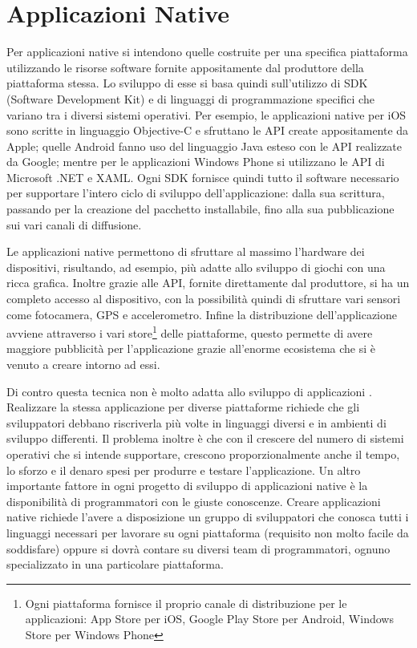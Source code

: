     \section{Applicazioni Native}
    \label{sec:nativapp}
        Per applicazioni native si intendono quelle costruite per una specifica
        piattaforma utilizzando le risorse software fornite appositamente dal
        produttore della piattaforma stessa.
        Lo sviluppo di esse si basa quindi sull'utilizzo di SDK
        (Soft\-ware De\-vel\-op\-ment Kit) e di
        linguaggi di programmazione specifici che variano tra i diversi
        sistemi operativi. Per esempio,
        le applicazioni native per iOS sono scritte in linguaggio Objective-C
        e sfruttano le API create appositamente da Apple; quelle Android fanno
        uso del linguaggio Java esteso con le API realizzate da Google; mentre
        per le applicazioni Windows Phone si utilizzano le API di
        Microsoft .NET e XAML. Ogni SDK fornisce quindi tutto il soft\-ware necessario
        per supportare l'intero ciclo di sviluppo dell'applicazione: dalla sua
        scrittura, passando per la creazione del pacchetto installabile, fino
        alla sua pubblicazione sui vari canali di diffusione.

        Le applicazioni native permettono di sfruttare al massimo l'hard\-ware
        dei dispositivi, risultando, ad esempio, più adatte allo sviluppo di giochi con
        una ricca grafica. Inoltre grazie alle
        API, fornite direttamente dal produttore, si ha un completo accesso al
        dispositivo, con la possibilità quindi di sfruttare vari sensori
        come fotocamera, GPS e accelerometro. Infine la distribuzione
        dell'applicazione avviene attraverso i vari \mbox{store}\footnote{Ogni
        piattaforma
        fornisce il proprio canale di distribuzione per le applicazioni:
        App Store per iOS, Google Play Store per Android, Windows Store per
        Windows Phone} delle piattaforme, questo permette di avere maggiore
        pubblicità per l'applicazione grazie all'enorme ecosistema che si è
        venuto a creare intorno ad essi.

        Di contro questa tecnica non è molto adatta allo sviluppo di
        applicazioni \crossplat{}. Realizzare la stessa applicazione per
        diverse piattaforme richiede che gli sviluppatori debbano riscriverla
        più volte in linguaggi diversi e in ambienti di
        sviluppo differenti. Il problema inoltre è che con il crescere del
        numero di sistemi operativi che si intende supportare, crescono
        proporzionalmente anche il tempo, lo
        sforzo e il denaro spesi per produrre e testare l'applicazione.
        Un altro importante fattore in ogni progetto di sviluppo di
        applicazioni native \crossplat{} è la disponibilità di programmatori
        con le giuste conoscenze. Creare applicazioni native richiede
        l'avere a disposizione un gruppo di sviluppatori che conosca tutti i
        linguaggi necessari per lavorare su ogni piattaforma (requisito
        non molto facile da soddisfare) oppure si dovrà contare su diversi team
        di programmatori, ognuno specializzato in una particolare piattaforma.

